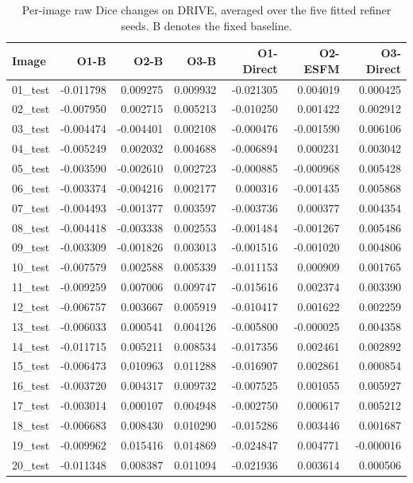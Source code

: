 \begin{table}[p]
\caption{Per-image raw Dice changes on DRIVE, averaged over the five fitted refiner seeds. B denotes the fixed baseline.}\label{tab:completion-drive-image-differences}
\centering\small\setlength{\tabcolsep}{4pt}
\begin{tabular}{lrrrrrr}
\toprule
Image & O1-B & O2-B & O3-B & O1-Direct & O2-ESFM & O3-Direct \\
\midrule
01\_test & -0.011798 & 0.009275 & 0.009932 & -0.021305 & 0.004019 & 0.000425 \\
02\_test & -0.007950 & 0.002715 & 0.005213 & -0.010250 & 0.001422 & 0.002912 \\
03\_test & -0.004474 & -0.004401 & 0.002108 & -0.000476 & -0.001590 & 0.006106 \\
04\_test & -0.005249 & 0.002032 & 0.004688 & -0.006894 & 0.000231 & 0.003042 \\
05\_test & -0.003590 & -0.002610 & 0.002723 & -0.000885 & -0.000968 & 0.005428 \\
06\_test & -0.003374 & -0.004216 & 0.002177 & 0.000316 & -0.001435 & 0.005868 \\
07\_test & -0.004493 & -0.001377 & 0.003597 & -0.003736 & 0.000377 & 0.004354 \\
08\_test & -0.004418 & -0.003338 & 0.002553 & -0.001484 & -0.001267 & 0.005486 \\
09\_test & -0.003309 & -0.001826 & 0.003013 & -0.001516 & -0.001020 & 0.004806 \\
10\_test & -0.007579 & 0.002588 & 0.005339 & -0.011153 & 0.000909 & 0.001765 \\
11\_test & -0.009259 & 0.007006 & 0.009747 & -0.015616 & 0.002374 & 0.003390 \\
12\_test & -0.006757 & 0.003667 & 0.005919 & -0.010417 & 0.001622 & 0.002259 \\
13\_test & -0.006033 & 0.000541 & 0.004126 & -0.005800 & -0.000025 & 0.004358 \\
14\_test & -0.011715 & 0.005211 & 0.008534 & -0.017356 & 0.002461 & 0.002892 \\
15\_test & -0.006473 & 0.010963 & 0.011288 & -0.016907 & 0.002861 & 0.000854 \\
16\_test & -0.003720 & 0.004317 & 0.009732 & -0.007525 & 0.001055 & 0.005927 \\
17\_test & -0.003014 & 0.000107 & 0.004948 & -0.002750 & 0.000617 & 0.005212 \\
18\_test & -0.006683 & 0.008430 & 0.010290 & -0.015286 & 0.003446 & 0.001687 \\
19\_test & -0.009962 & 0.015416 & 0.014869 & -0.024847 & 0.004771 & -0.000016 \\
20\_test & -0.011348 & 0.008387 & 0.011094 & -0.021936 & 0.003614 & 0.000506 \\
\bottomrule
\end{tabular}
\end{table}

